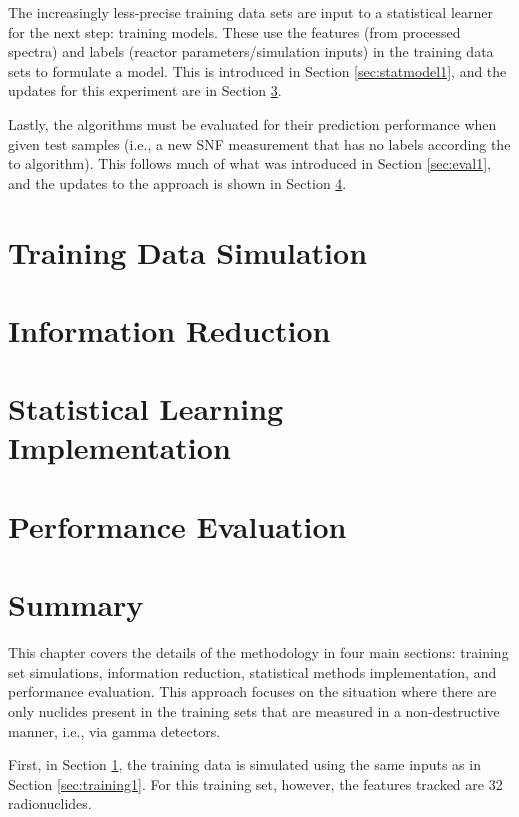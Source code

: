 The increasingly less-precise training data sets are input to a statistical
learner for the next step: training models.  These use the features (from
processed spectra) and labels (reactor parameters/simulation inputs) in the
training data sets to formulate a model.  This is introduced in Section
\ref{sec:statmodel1}, and the updates for this experiment are in Section
\ref{sec:statmodel2}. 

Lastly, the algorithms must be evaluated for their prediction performance when
given test samples (i.e., a new \gls{SNF} measurement that has no labels
according the to algorithm).  This follows much of what was introduced in
Section \ref{sec:eval1}, and the updates to the approach is shown in Section
\ref{sec:eval2}. 

\section{Training Data Simulation}
\label{sec:training2}


\section{Information Reduction}
\label{sec:inforeduc2}


\section{Statistical Learning Implementation}
\label{sec:statmodel2}


\section{Performance Evaluation}
\label{sec:eval2}


\section{Summary}

This chapter covers the details of the methodology in four main sections:
training set simulations, information reduction, statistical methods
implementation, and performance evaluation. This approach focuses on the
situation where there are only nuclides present in the training sets that 
are measured in a non-destructive manner, i.e., via gamma detectors. 

First, in Section \ref{sec:training2}, the training data is simulated using the
same inputs as in Section \ref{sec:training1}. For this training set, however,
the features tracked are 32 radionuclides.

